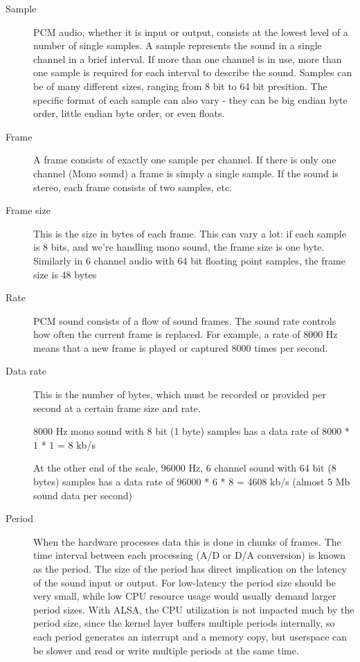 \begin{description}
\item[Sample] PCM audio, whether it is input or output, consists at the lowest level
of a number of single samples. A sample represents the sound in a single channel in
a brief interval. If more than one channel is in use, more than one sample is required
for each interval to describe the sound. Samples can be of many different sizes, ranging
from 8 bit to 64 bit presition. The specific format of each sample can also vary - they 
can be big endian byte order, little endian byte order, or even floats.

\item[Frame] A frame consists of exactly one sample per channel. If there is only one
channel (Mono sound) a frame is simply a single sample. If the sound is stereo, each frame
consists of two samples, etc.

\item[Frame size] This is the size in bytes of each frame. This can vary a lot: if each sample is
8 bits, and we're handling mono sound, the frame size is one byte. Similarly in 6 channel audio with
64 bit floating point samples, the frame size is 48 bytes

\item[Rate] PCM sound consists of a flow of sound frames. The sound rate controls how often
the current frame is replaced. For example, a rate of 8000 Hz means that a new frame is played 
or captured 8000 times per second.

\item[Data rate] This is the number of bytes, which must be recorded or provided per second
at a certain frame size and rate. 

8000 Hz mono sound with 8 bit (1 byte) samples has a data rate of 8000 * 1 * 1 = 8 kb/s

At the other end of the scale, 96000 Hz, 6 channel sound with 64 bit (8 bytes) samples
has a data rate of 96000 * 6 * 8 = 4608 kb/s (almost 5 Mb sound data per second)

\item[Period] When the hardware processes data this is done in chunks of frames. The time interval
between each processing (A/D or D/A conversion) is known as the period. The size of the period has
direct implication on the latency of the sound input or output. For low-latency the period size should
be very small, while low CPU resource usage would usually demand larger period sizes. With ALSA, the
CPU utilization is not impacted much by the period size, since the kernel layer buffers multiple
periods internally, so each period generates an interrupt and a memory copy, but userspace can be
slower and read or write multiple periods at the same time.


\end{description}
